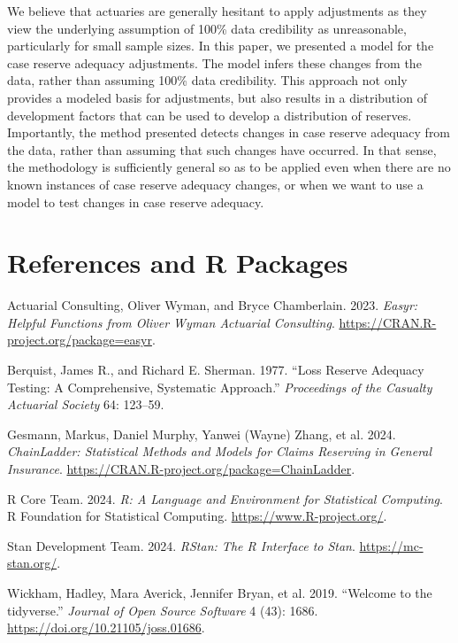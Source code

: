 \documentclass[
  letterpaper,
  DIV=11,
  numbers=noendperiod]{scrartcl}
\newlength{\cslhangindent}
\newenvironment{CSLReferences}[2] %
 {\begin{list}{}{%
  \setlength{\itemindent}{0pt}
  \setlength{\leftmargin}{0pt}
  \setlength{\parsep}{0pt}
  \ifodd #1
   \setlength{\leftmargin}{\cslhangindent}
   \setlength{\itemindent}{-1\cslhangindent}
  \fi
  \setlength{\itemsep}{#2\baselineskip}}}
 {\end{list}}
\begin{document}
We believe that actuaries are generally hesitant to apply
\bs adjustments as they view the underlying assumption of 100\% data
credibility as unreasonable, particularly for small sample sizes. In
this paper, we presented a model for the \bs case reserve adequacy
adjustments. The model infers these changes from the data, rather than
assuming 100\% data credibility. This approach not only provides a
modeled basis for \bs adjustments, but also results in a distribution of
development factors that can be used to develop a distribution of
reserves. Importantly, the method presented detects changes in case
reserve adequacy from the data, rather than assuming that such changes
have occurred. In that sense, the methodology is sufficiently general so
as to be applied even when there are no known instances of case reserve
adequacy changes, or when we want to use a model to test changes in case
reserve adequacy.

\section*{References and R Packages}\label{references-and-r-packages}

\protect{}\label{refs}
\begin{CSLReferences}{1}{1}
Actuarial Consulting, Oliver Wyman, and Bryce Chamberlain. 2023.
\emph{Easyr: Helpful Functions from Oliver Wyman Actuarial Consulting}.
\url{https://CRAN.R-project.org/package=easyr}.

Berquist, James R., and Richard E. Sherman. 1977. {``Loss Reserve
Adequacy Testing: A Comprehensive, Systematic Approach.''}
\emph{Proceedings of the Casualty Actuarial Society} 64: 123--59.

Gesmann, Markus, Daniel Murphy, Yanwei (Wayne) Zhang, et al. 2024.
\emph{ChainLadder: Statistical Methods and Models for Claims Reserving
in General Insurance}.
\url{https://CRAN.R-project.org/package=ChainLadder}.

R Core Team. 2024. \emph{R: A Language and Environment for Statistical
Computing}. R Foundation for Statistical Computing.
\url{https://www.R-project.org/}.

Stan Development Team. 2024. \emph{{RStan}: The {R} Interface to
{Stan}}. \url{https://mc-stan.org/}.

Wickham, Hadley, Mara Averick, Jennifer Bryan, et al. 2019. {``Welcome
to the {tidyverse}.''} \emph{Journal of Open Source Software} 4 (43):
1686. \url{https://doi.org/10.21105/joss.01686}.

\end{CSLReferences}
\end{document}
